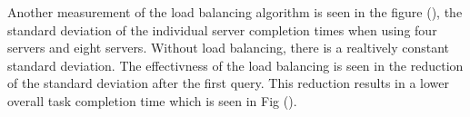 \documentclass{article}
\newenvironment{Figure}
               {\par\medskip\noindent\minipage{\linewidth}}
               {\endminipage\par\medskip}
\begin{document}
\begin{multicols}{2}
\begin{Figure}
  \centering
  \noindent{}
\end{Figure}


Another measurement of the load balancing algorithm is seen in the figure (), the standard deviation of the individual server completion times when using four servers and eight servers.  Without load balancing, there is a realtively constant standard deviation.  The effectivness of the load balancing is seen in the reduction of the standard deviation after the first query.  This reduction results in a lower overall task completion time which is seen in Fig ().


\end{multicols}
\end{document}

